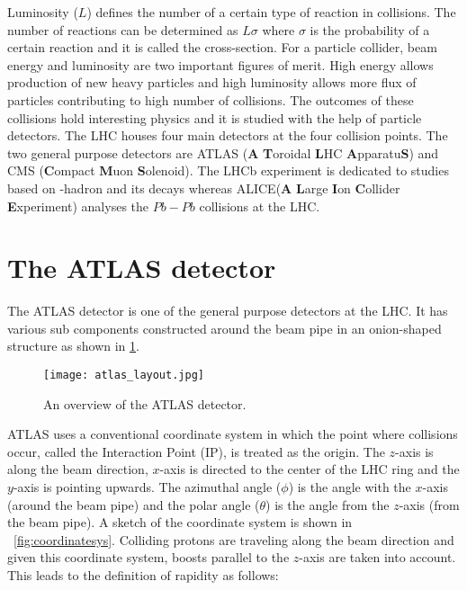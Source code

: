 Luminosity ($L$) defines the number of a certain type of reaction in collisions. The number of reactions can be determined as $L\sigma$ where $\sigma$ is the 
probability of a certain reaction and it is called the cross-section. For a particle collider, beam energy and luminosity are two important figures of merit. 
High energy allows production of new heavy particles and high luminosity allows more flux of particles contributing to high number of collisions. The outcomes
of these collisions hold interesting physics and it is studied with the help of particle detectors. The LHC houses four main detectors at the four collision
points. The two general purpose detectors are ATLAS (\textbf{A} \textbf{T}oroidal \textbf{L}HC \textbf{A}pparatu\textbf{S})\cite{TheATLASCollaboration_2008} and
CMS (\textbf{C}ompact \textbf{M}uon \textbf{S}olenoid)\cite{TheCMSCollaboration_2008}. The LHCb experiment\cite{TheLHCbCollaboration_2008} is dedicated to 
studies based on \PB-hadron and its decays whereas ALICE(\textbf{A} \textbf{L}arge \textbf{I}on \textbf{C}ollider \textbf{E}xperiment)\cite{TheALICECollaboration_2008}
analyses the $Pb-Pb$ collisions at the LHC. 


\section{The ATLAS detector}
The ATLAS detector is one of the general purpose detectors at the LHC. It has various sub components constructed around the beam pipe in an onion-shaped structure as shown
in \cref{fig:atlas}.

\begin{figure}[htbp]
    \centering
    \texttt{[image: atlas\_layout.jpg]}
    \caption[Overview of the ATLAS detector]{An overview of the ATLAS detector\cite{Pequenao:1095924}.}%
    \label{fig:atlas}
\end{figure}

ATLAS uses a conventional coordinate system in which the point where collisions occur, called the Interaction Point (IP), is treated as the origin. The 
$z$-axis is along the beam direction, $x$-axis is directed to the center of the LHC ring and the $y$-axis is pointing upwards. The azimuthal angle ($\phi$) 
is the angle with the $x$-axis (around the beam pipe) and the polar angle ($\theta$) is the angle from the $z$-axis (from the beam pipe). A sketch of the coordinate
system is shown in ~\cref{fig:coordinatesys}. Colliding protons are traveling along the beam direction and given this coordinate system, boosts parallel to the $z$-axis are 
taken into account. This leads to the definition of rapidity as follows:

